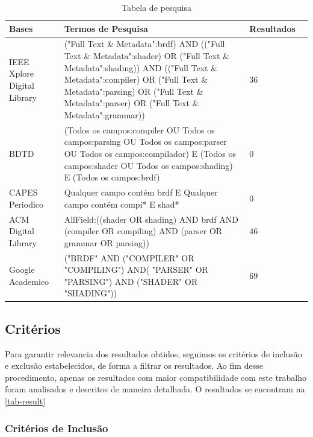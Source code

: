 \documentclass[english, 
               brazil, 
               bsc] %
               {dcomp-abntex2}
\begin{document}
\begin{table}[H]
\ABNTEXfontereduzida
\caption[bases]{Tabela de pesquisa}
\label{tab-bases}
\begin{tabular}{p{2.6cm}|p{6.0cm}|p{2.25cm}|p{3.40cm}}
   \textbf{Bases} & \textbf{Termos de Pesquisa}  & \textbf{Resultados}\\
   \hline
    IEEE Xplore Digital Library
    &
    ("Full Text \& Metadata":brdf)
AND (("Full Text \& Metadata":shader) OR  ("Full Text \& Metadata":shading))
AND (("Full Text \& Metadata":compiler) OR  ("Full Text \& Metadata":parsing) OR  ("Full Text \& Metadata":parser) OR  ("Full Text \& Metadata":grammar))
   & 36
    \\ \hline

    BDTD
    & (Todos os campos:compiler OU Todos os campos:parsing OU Todos os campos:parser OU Todos os campos:compilador) E (Todos os campos:shader OU Todos os campos:shading) E (Todos os campos:brdf)
    & 0
    \\ \hline
    CAPES Periodico
    &  Qualquer campo contém brdf E 
 Qualquer campo contém compi* E shad*  
    & 0
    \\ \hline

  ACM Digital Library
  & AllField:((shader OR shading) AND brdf AND (compiler OR compiling) AND (parser OR grammar OR parsing))
  & 46
    \\ \hline

 Google Academico 
  & 
  ("BRDF" AND ("COMPILER" OR "COMPILING") AND( "PARSER" OR "PARSING") AND ("SHADER" OR "SHADING"))
  & 69
\end{tabular}
\end{table}

\subsection{Critérios}

Para garantir relevancia dos resultados obtidos, seguimos os critérios de inclusão e exclusão estabelecidos, de forma a filtrar os resultados. Ao fim desse procedimento, apenas os resultados com maior compatibilidade com este trabalho foram analisados e descritos de maneira detalhada. O resultados se encontram na \autoref{tab-result}

\subsubsection{Critérios de Inclusão}
\end{document}
